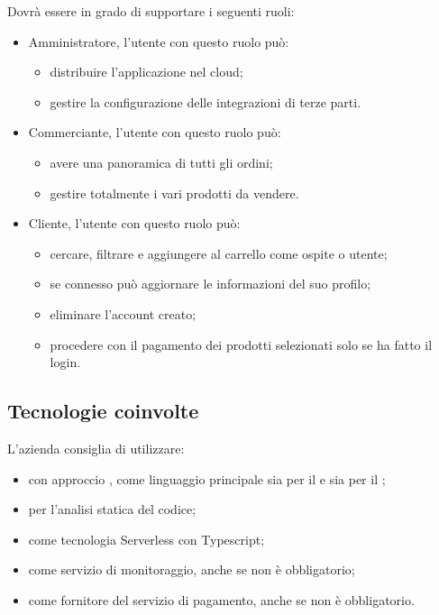 Dovrà essere in grado di supportare i seguenti ruoli:
\begin{itemize}
	\item Amministratore, l'utente con questo ruolo può:
		\begin{itemize}
			\item distribuire l'applicazione nel cloud;
			\item gestire la configurazione delle integrazioni di terze parti.
		\end{itemize}
	\item Commerciante, l'utente con questo ruolo può:
		\begin{itemize}
			\item avere una panoramica di tutti gli ordini;
			\item gestire totalmente i vari prodotti da vendere.
		\end{itemize}
	\item Cliente, l'utente con questo ruolo può:
	\begin{itemize}
		\item cercare, filtrare e aggiungere al carrello come ospite o utente;
		\item se connesso può aggiornare le informazioni del suo profilo;
		\item eliminare l'account creato;
		\item procedere con il pagamento dei prodotti selezionati solo se ha fatto il login.
	\end{itemize}
\end{itemize}

\subsection{Tecnologie coinvolte}
L'azienda consiglia di utilizzare:
\begin{itemize}
	\item {} con approccio , come linguaggio principale sia per il  e sia per il ;
	\item {} per l'analisi statica del codice;
	\item {} come tecnologia Serverless con Typescript;
	\item {} come servizio di monitoraggio, anche se non è obbligatorio;
	\item {} come fornitore del servizio di pagamento, anche se non è obbligatorio.
\end{itemize}


